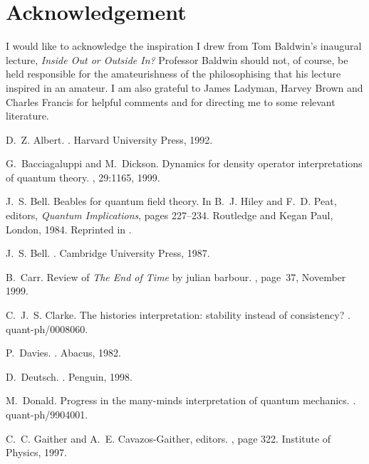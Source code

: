 \documentclass[12pt,a4paper,reqno]{article}
\renewcommand{\(}{\left(}
\renewcommand{\)}{\right)}
\newcommand{\<}{\langle}
\renewcommand{\>}{\rangle}
\theoremstyle{plain} %
\theoremstyle{definition}
\theoremstyle{remark}
\begin{document}
\section*{Acknowledgement}

I would like to acknowledge the inspiration I drew from Tom Baldwin's
inaugural lecture, \emph{Inside Out or Outside In?} Professor Baldwin
should not, of course, be held responsible for the amateurishness of the
philosophising that his lecture inspired in an amateur. I am also
grateful to James Ladyman, Harvey Brown and Charles Francis for
helpful comments and for directing me to some relevant literature.


%
%

\begin{thebibliography}{10}

D.~Z. Albert.
.
\newblock Harvard University Press, 1992.

G.~Bacciagaluppi and M.~Dickson.
\newblock Dynamics for density operator interpretations of quantum theory.
, 29:1165, 1999.

J.~S. Bell.
\newblock Beables for quantum field theory.
\newblock In B.~J. Hiley and F.~D. Peat, editors, {\em Quantum Implications},
  pages 227--234. Routledge and Kegan Paul, London, 1984.
\newblock Reprinted in \cite{Bell:book}.

J.~S. Bell.
.
\newblock Cambridge University Press, 1987.

B.~Carr.
\newblock Review of \emph{The End of Time} by julian barbour.
, page~37, November 1999.

C.~J.~S. Clarke.
\newblock The histories interpretation: stability instead of consistency?
.
\newblock quant-ph/0008060.

P.~Davies.
.
\newblock Abacus, 1982.

D.~Deutsch.
.
\newblock Penguin, 1998.

M.~Donald.
\newblock Progress in the many-minds interpretation of quantum mechanics.
.
\newblock quant-ph/9904001.

C.~C. Gaither and A.~E. Cavazos-Gaither, editors.
, page 322.
\newblock Institute of Physics, 1997.


\end{thebibliography}
\end{document}
